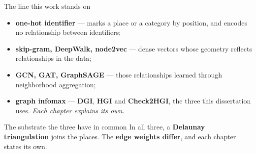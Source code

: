 \documentclass{beamer}
\begin{document}
%
\begin{frame}{The line this work stands on}
    \vfill
    \begin{itemize}\setlength{\itemsep}{4pt}
        \item \textbf{one-hot identifier} --- marks a place or a category by position, and encodes
              no relationship between identifiers;
        \item \textbf{skip-gram, DeepWalk, node2vec} --- dense vectors whose geometry reflects
              relationships in the data;
        \item \textbf{GCN, GAT, GraphSAGE} --- those relationships learned through neighborhood
              aggregation;
        \item \alert{\textbf{graph infomax}} --- \textbf{DGI}, \textbf{HGI} and \textbf{Check2HGI},
              the three this dissertation uses. \textit{Each chapter explains its own.}
    \end{itemize}

    \vfill
    \begin{exampleblock}{The substrate the three have in common}
        \small
        In all three, a \textbf{Delaunay triangulation} joins the places. The \textbf{edge weights
        differ}, and each chapter states its own.
    \end{exampleblock}
    \vfill
\end{frame}
\end{document}
